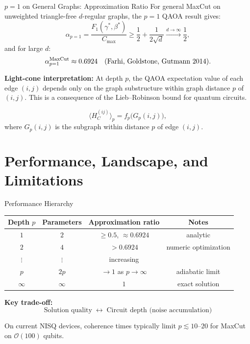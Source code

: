 \documentclass{beamer}
\begin{document}

\begin{frame}{$p=1$ on General Graphs: Approximation Ratio}
For general MaxCut on unweighted triangle-free $d$-regular graphs,
the $p=1$ QAOA result gives:
\[
\alpha_{p=1}
= \frac{F_1(\gamma^*,\beta^*)}{C_{\max}}
\ge \frac{1}{2} + \frac{1}{2\sqrt{d}}
\xrightarrow{d\to\infty} \frac{1}{2},
\]
and for large $d$:
\[
\alpha_{p=1}^{\rm MaxCut} \approx 0.6924 \quad
\text{(Farhi, Goldstone, Gutmann 2014).}
\]

\textbf{Light-cone interpretation:}  At depth $p$, the QAOA
expectation value of each edge $(i,j)$ depends only on the graph
substructure within graph distance $p$ of $(i,j)$.
This is a consequence of the Lieb--Robinson bound for quantum circuits.

\[
\langle H_C^{(ij)}\rangle_p = f_p\bigl(G_p(i,j)\bigr),
\]
where $G_p(i,j)$ is the subgraph within distance $p$ of edge $(i,j)$.
\end{frame}


\section{Performance, Landscape, and Limitations}

\begin{frame}{Performance Hierarchy}
\begin{center}
\begin{tabular}{cccc}
\hline
Depth $p$ & Parameters & Approximation ratio & Notes \\
\hline
$1$ & $2$ & $\ge 0.5$, $\approx 0.6924$ & analytic \\
$2$ & $4$ & $> 0.6924$ & numeric optimization \\
$\vdots$ & $\vdots$ & increasing & \\
$p$ & $2p$ & $\to 1$ as $p\to\infty$ & adiabatic limit \\
$\infty$ & $\infty$ & $1$ & exact solution \\
\hline
\end{tabular}
\end{center}

\medskip

\textbf{Key trade-off:}
\[
\text{Solution quality} \;\;\longleftrightarrow\;\;
\text{Circuit depth (noise accumulation)}
\]

On current NISQ devices, coherence times typically limit $p \lesssim
10$--$20$ for MaxCut on $\mathcal{O}(100)$ qubits.
\end{frame}
\end{document}
